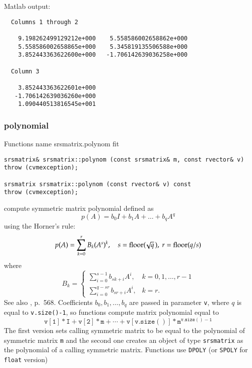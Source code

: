 Matlab output:
\begin{Verbatim}
  Columns 1 through 2 

    9.198262499129212e+000    5.558586002658862e+000
    5.558586002658865e+000    5.345819135506588e+000
    3.852443363622600e+000   -1.706142639036258e+000

  Column 3 

    3.852443363622601e+000
   -1.706142639036260e+000
    1.090440513816545e+001
\end{Verbatim}
\newpage



\subsubsection{polynomial}
Functions%
\pdfdest name {srsmatrix.polynom} fit
\begin{verbatim}
srsmatrix& srsmatrix::polynom (const srsmatrix& m, const rvector& v)
throw (cvmexception);

srsmatrix srsmatrix::polynom (const rvector& v) const
throw (cvmexception);
\end{verbatim}
compute  symmetric matrix polynomial defined as
\begin{equation*}
p(A)=b_0I+b_1A+\dots+b_qA^q
\end{equation*}
using the Horner's rule:
\begin{equation*}
p(A)=\sum_{k=0}^r B_k(A^s)^k,\quad s=\operatorname{floor}(\!\sqrt{q}\,),\ r=\operatorname{floor}(q/s)
\end{equation*}
where
\begin{equation*}
B_k=\begin{cases}
\sum\limits_{i=0}^{s-1}b_{sk+i} A^i, & k=0,1,\dots,r-1\\
\sum\limits_{i=0}^{q-sr}b_{sr+i} A^i, & k=r.
\end{cases}
\end{equation*}
See also , p.~568.
Coefficients $b_0,b_1,\dots,b_q$ are passed in  parameter 
\verb"v",
where $q$ is equal to \verb"v.size()-1", so  functions
compute matrix polynomial equal to
\begin{equation*}
\mathtt{v[1]*I + v[2]*m +\cdots + v[v.size()]*m^{v.size()-1}}
\end{equation*}
The first version sets  calling symmetric matrix to be equal 
to the polynomial of  symmetric matrix \verb"m"
and the second one
creates an object of type \verb"srsmatrix" as the 
polynomial of a calling symmetric matrix.
Functions use \verb"DPOLY" (or \verb"SPOLY" for \verb"float" version)
